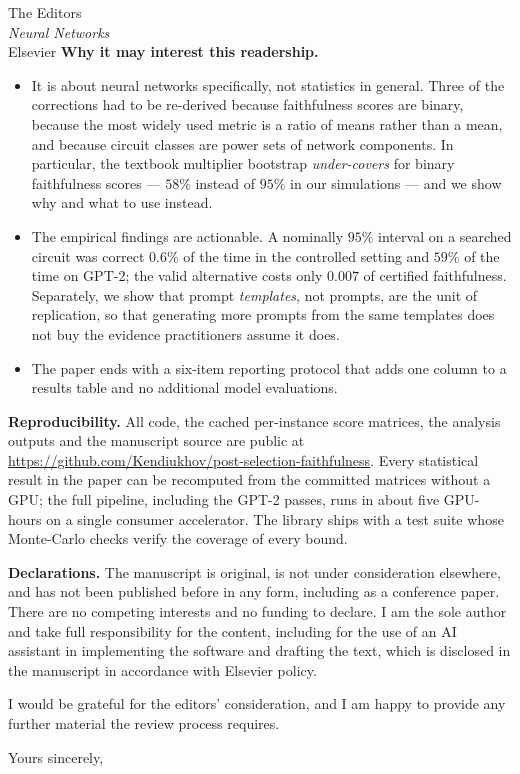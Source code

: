\documentclass[11pt]{letter}
\begin{document}
\begin{letter}{The Editors\\ \textit{Neural Networks}\\ Elsevier}
\medskip
\noindent\textbf{Why it may interest this readership.}
\begin{itemize}\itemsep2pt
\item It is about neural networks specifically, not statistics in general. Three
of the corrections had to be re-derived because faithfulness scores are binary,
because the most widely used metric is a ratio of means rather than a mean, and
because circuit classes are power sets of network components. In particular, the
textbook multiplier bootstrap \emph{under-covers} for binary faithfulness scores
--- $58\%$ instead of $95\%$ in our simulations --- and we show why and what to
use instead.
\item The empirical findings are actionable. A nominally $95\%$ interval on a
searched circuit was correct $0.6\%$ of the time in the controlled setting and
$59\%$ of the time on GPT-2; the valid alternative costs only $0.007$ of
certified faithfulness. Separately, we show that prompt \emph{templates}, not
prompts, are the unit of replication, so that generating more prompts from the
same templates does not buy the evidence practitioners assume it does.
\item The paper ends with a six-item reporting protocol that adds one column to a
results table and no additional model evaluations.
\end{itemize}

\medskip
\noindent\textbf{Reproducibility.}
All code, the cached per-instance score matrices, the analysis outputs and the
manuscript source are public at
\url{https://github.com/Kendiukhov/post-selection-faithfulness}. Every
statistical result in the paper can be recomputed from the committed matrices
without a GPU; the full pipeline, including the GPT-2 passes, runs in about five
GPU-hours on a single consumer accelerator. The library ships with a test suite
whose Monte-Carlo checks verify the coverage of every bound.

\medskip
\noindent\textbf{Declarations.}
The manuscript is original, is not under consideration elsewhere, and has not
been published before in any form, including as a conference paper. There are no
competing interests and no funding to declare. I am the sole author and take full
responsibility for the content, including for the use of an AI assistant in
implementing the software and drafting the text, which is disclosed in the
manuscript in accordance with Elsevier policy.

\medskip
\noindent I would be grateful for the editors' consideration, and I am happy to
provide any further material the review process requires.

\closing{Yours sincerely,}

\end{letter}
\end{document}
